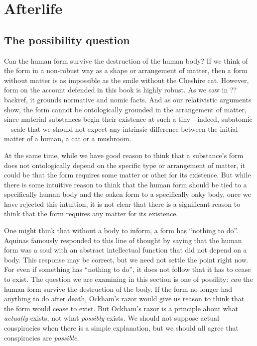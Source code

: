 \section{Afterlife}
\subsection{The possibility question}
Can the human form survive the destruction of the human body? If we think of the form in a non-robust way as 
a shape or arrangement of matter, then a form without matter is as 
impossible as the smile without the Cheshire cat. However, form on the account defended in this book is highly robust. 
As we saw in ??backref, it grounds normative and nomic facts. And as our relativistic arguments show, the form cannot
be ontologically grounded in the arrangement of matter, since material substances begin their existence at such a tiny---indeed, subatomic---scale  that we should not expect any intrinsic difference between the initial matter of a human, a cat or a mushroom.

At the same time, while we have good reason to think that a substance's form does not ontologically depend on the specific type or arrangement of matter, it could be that the form requires some matter or other for its existence. But while there is some intuitive 
reason to think that the human form should be tied to a specifically human body and the oaken form to a specifically oaky body,
once we have rejected this intuition, it is not clear that there is a significant reason to think that the form requires any 
matter for its existence. 

One might think that without a body to inform, a form has ``nothing to do''. Aquinas famously responded to this line of thought
by saying that the human form was a soul with an abstract intellectual function that did not depend on a body. This response may 
be correct, but we need not settle the point right now. For even if something has ``nothing to do'', it does not follow that 
it has to cease to exist. The question we are examining in this section is one of possility: \textit{can} the human form survive the 
destruction of the body. If the form no longer had anything to do after death, Ockham's razor would give us reason to think that the form would cease to exist. But Ockham's razor is a principle about what \textit{actually} exists, not what \textit{possibly}
exists. We should not suppose actual conspiracies when there is a simple explanation, but we should all agree that conspiracies
are \textit{possible}. 


